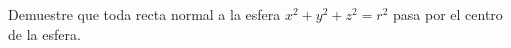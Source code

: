 \item Demuestre que toda recta normal a la esfera $x^2 + y^2 + z^2 = r^2$ pasa por el centro de la esfera.
